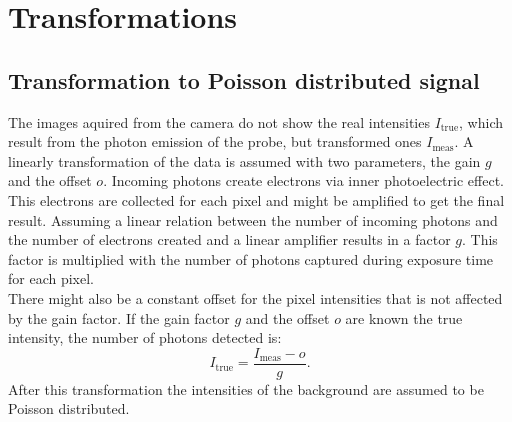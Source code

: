 \section{Transformations}
\subsection{Transformation to Poisson distributed signal} \label{trafoPoiss}
The images aquired from the camera do not show the real intensities
$I_\text{true}$, which result from the photon emission of the probe, but
transformed ones $I_\text{meas}$.\newline
A linearly transformation of the data is assumed with two parameters, the gain $g$ and the offset $o$.
Incoming photons create electrons via inner photoelectric effect. This electrons
are collected for each pixel and might be amplified to get the final result.
Assuming a linear relation between the number of incoming photons and the number
of electrons created and a linear amplifier results in a factor $g$. This factor
is multiplied with the number of photons captured during exposure time for each
pixel.\\
There might also be a constant offset for the pixel intensities that is not affected by the gain factor.
If the gain factor $g$ and the offset $o$ are known the true intensity, the
number of photons detected is:
\begin{equation}
	I_\text{true} = \dfrac{I_\text{meas}-o}{g}. \label{transtopoiss}
\end{equation}
After this transformation the intensities of the background are assumed to be Poisson distributed.
